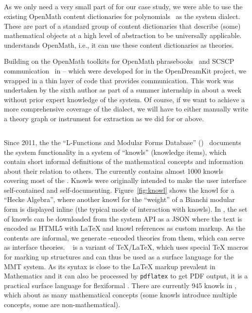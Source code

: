 \subsection{\Singular}

As we only need a very small part of \Singular for our case study, we were able to use the existing OpenMath content dictionaries for polynomials~\cite{OMCD:poly:on} as the \Singular system dialect.
These are part of a standard group of content dictionaries that describe (some) mathematical objects at a high level of abstraction to be universally applicable.
\OMMT understands OpenMath, i.e., it can use these content dictionaries as \OMMT theories.

Building on the OpenMath toolkits for OpenMath phrasebooks~\cite{py-openmath:on} and SCSCP communication~\cite{py-scscp:on} in {\Python} -- which were developed for \Sage in the
OpenDreamKit project, we wrapped \Singular in a thin layer of \Python code that provides \SCSCP communication.
This work was undertaken by the sixth author as part of a summer internship in about a week without prior expert knowledge of the system. Of course, if we want to achieve a more comprehensive coverage of the \Singular dialect, we will have to either manually write a theory graph or instrument \Singular for extraction as we did for \Sage or \GAP above. 

\subsection{\LMFDB}

Since 2011, the the ``L-Functions and Modular Forms Database'' (\LMFDB)~\cite{Cremona:LMFDB16,lmfdb:on} documents the system functionality in a system of ``knowls'' (knowledge items), which contain short informal definitions of the mathematical concepts and information about their relation to others.
The \LMFDB currently contains almost 1000 knowls covering most of the \LMFDB.
Knowls were originally intended to make the \LMFDB user interface self-contained and self-documenting.
Figure~\ref{fig:knowl} shows the knowl for a ``Hecke Algebra'', where another knowl for the ``weight'' of a Bianchi modular form is displayed inline (the typical mode of interaction with knowls).
In \LMFDB, the set of knowls can be downloaded from the system API as a JSON where the
text is encoded as HTML5 with {\LaTeX} and knowl references as custom markup. As the
contents are informal, we generate \sTeX-encoded \ommt theories from them, which can serve as interface theories.
\sTeX~\cite{Kohlhase:ulsmf08,sTeX:github:on} is a variant of {\TeX/\LaTeX}, which uses special {\TeX} macros for marking up \ommt structures and can thus be used as a surface language for the MMT system.
As its syntax is close to the {\LaTeX} markup prevalent in Mathematics and it can also be processed by \texttt{pdflatex} to get PDF output, it is a practical surface language for flexiformal \ommt.
There are currently 945 knowls in \LMFDB, which about as many mathematical concepts (some knowls introduce multiple concepts, some are non-mathematical). 

